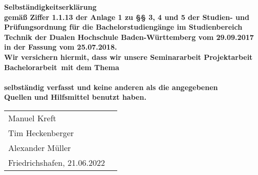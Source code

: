 \thispagestyle{empty}
\begin{center}
	\vspace*{2cm}
	\Huge\bf Selbständigkeitserklärung\\
	\vspace*{3cm}
	\normalsize\rm
	gemäß Ziffer 1.1.13 der Anlage 1 zu §§ 3, 4 und 5  der Studien- und Prüfungsordnung für die Bachelorstudiengänge im Studienbereich Technik der Dualen Hochschule Baden-Württemberg vom 29.09.2017 in der Fassung vom 25.07.2018. \\
	\vspace*{1cm}
	\normalsize\rm
	Wir versichern hiermit, dass wir unsere \ifcase\myType Seminararbeit \or Projektarbeit \or Bachelorarbeit\else\fi ~mit dem Thema\\
	\vspace*{1,5cm}
	\Large\bf\myTopic\\
	\vspace*{2cm}
	\normalsize\rm
	selbständig verfasst und keine anderen als die angegebenen\\Quellen und Hilfsmittel benutzt haben.\\
	\vfill
\end{center}
\begin{tabular}{ll}
    Manuel Kreft\\
    Tim Heckenberger\\
    Alexander Müller\\
	Friedrichshafen, 21.06.2022 
\end{tabular}
